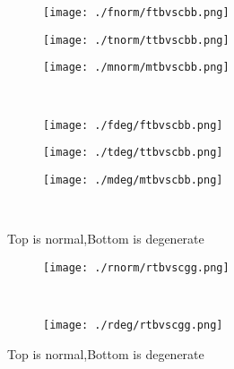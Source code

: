 \documentclass[aps,floats,floatfix,nofootinbib]{revtex4-1}
\begin{document}
\begin{center}
\begin{figure}
\begin{subfigure}{0.3\textwidth}
\texttt{[image: ./fnorm/ftbvscbb.png]}
\label{}
\end{subfigure}
\begin{subfigure}{0.3\textwidth}
\texttt{[image: ./tnorm/ttbvscbb.png]}
\label{}
\end{subfigure}
\begin{subfigure}{0.3\textwidth}
\texttt{[image: ./mnorm/mtbvscbb.png]}
\label{}
\end{subfigure}\\
\begin{subfigure}{0.3\textwidth}
\texttt{[image: ./fdeg/ftbvscbb.png]}
\label{}
\end{subfigure}
\begin{subfigure}{0.3\textwidth}
\texttt{[image: ./tdeg/ttbvscbb.png]}
\label{}
\end{subfigure}
\begin{subfigure}{0.3\textwidth}
\texttt{[image: ./mdeg/mtbvscbb.png]}
\label{}
\end{subfigure}\\
\caption{Top is normal,Bottom is degenerate}
\end{figure}
\end{center}

\begin{center}
\begin{figure}
\begin{subfigure}{1.0\textwidth}
\texttt{[image: ./rnorm/rtbvscgg.png]}
\label{}
\end{subfigure}\\
\begin{subfigure}{1.0\textwidth}
\texttt{[image: ./rdeg/rtbvscgg.png]}
\label{}
\end{subfigure}
\caption{Top is normal,Bottom is degenerate}
\end{figure}
\end{center}
\end{document}

